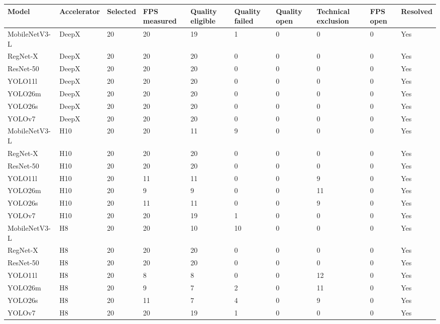 \begin{tabular}{@{}llllllllll@{}}
\toprule
Model & Accelerator & Selected & FPS measured & Quality eligible & Quality failed & Quality open & Technical exclusion & FPS open & Resolved \\
\midrule
MobileNetV3-L & DeepX & 20 & 20 & 19 & 1 & 0 & 0 & 0 & Yes \\
RegNet-X & DeepX & 20 & 20 & 20 & 0 & 0 & 0 & 0 & Yes \\
ResNet-50 & DeepX & 20 & 20 & 20 & 0 & 0 & 0 & 0 & Yes \\
YOLO11l & DeepX & 20 & 20 & 20 & 0 & 0 & 0 & 0 & Yes \\
YOLO26m & DeepX & 20 & 20 & 20 & 0 & 0 & 0 & 0 & Yes \\
YOLO26s & DeepX & 20 & 20 & 20 & 0 & 0 & 0 & 0 & Yes \\
YOLOv7 & DeepX & 20 & 20 & 20 & 0 & 0 & 0 & 0 & Yes \\
MobileNetV3-L & H10 & 20 & 20 & 11 & 9 & 0 & 0 & 0 & Yes \\
RegNet-X & H10 & 20 & 20 & 20 & 0 & 0 & 0 & 0 & Yes \\
ResNet-50 & H10 & 20 & 20 & 20 & 0 & 0 & 0 & 0 & Yes \\
YOLO11l & H10 & 20 & 11 & 11 & 0 & 0 & 9 & 0 & Yes \\
YOLO26m & H10 & 20 & 9 & 9 & 0 & 0 & 11 & 0 & Yes \\
YOLO26s & H10 & 20 & 11 & 11 & 0 & 0 & 9 & 0 & Yes \\
YOLOv7 & H10 & 20 & 20 & 19 & 1 & 0 & 0 & 0 & Yes \\
MobileNetV3-L & H8 & 20 & 20 & 10 & 10 & 0 & 0 & 0 & Yes \\
RegNet-X & H8 & 20 & 20 & 20 & 0 & 0 & 0 & 0 & Yes \\
ResNet-50 & H8 & 20 & 20 & 20 & 0 & 0 & 0 & 0 & Yes \\
YOLO11l & H8 & 20 & 8 & 8 & 0 & 0 & 12 & 0 & Yes \\
YOLO26m & H8 & 20 & 9 & 7 & 2 & 0 & 11 & 0 & Yes \\
YOLO26s & H8 & 20 & 11 & 7 & 4 & 0 & 9 & 0 & Yes \\
YOLOv7 & H8 & 20 & 20 & 19 & 1 & 0 & 0 & 0 & Yes \\
\bottomrule
\end{tabular}
